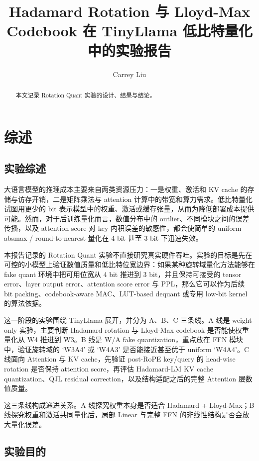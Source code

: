 \documentclass[lang=cn,chinesefont=nofont,a4paper,newtx]{elegantpaper}
\title{Hadamard Rotation 与 Lloyd-Max Codebook 在 TinyLlama 低比特量化中的实验报告}
\author{Carrey Liu}
\institute{Zhejiang University}
\date{\zhdate{2026/5/9}}
\begin{document}
\maketitle

\begin{abstract}
本文记录 Rotation Quant 实验的设计、结果与结论。
\end{abstract}

\section{综述}

\subsection{实验综述}

大语言模型的推理成本主要来自两类资源压力：一是权重、激活和 KV cache 的存储与访存开销，二是矩阵乘法与 attention 计算中的带宽和算力需求。低比特量化试图用更少的 bit 表示模型中的权重、激活或缓存张量，从而为降低部署成本提供可能。然而，对于后训练量化而言，数值分布中的 outlier、不同模块之间的误差传播，以及 attention score 对 key 内积误差的敏感性，都会使简单的 uniform absmax / round-to-nearest 量化在 4 bit 甚至 3 bit 下迅速失效。

本报告记录的 Rotation Quant 实验不直接研究真实硬件吞吐。实验的目标是先在可控的小模型上验证数值质量和低比特位宽边界：如果某种旋转域量化方法能够在 fake quant 环境中把可用位宽从 4 bit 推进到 3 bit，并且保持可接受的 tensor error、layer output error、attention score error 与 PPL，那么它可以作为后续 bit packing、codebook-aware MAC、LUT-based dequant 或专用 low-bit kernel 的算法依据。

这一阶段的实验围绕 TinyLlama 展开，并分为 A、B、C 三条线。A 线是 weight-only 实验，主要判断 Hadamard rotation 与 Lloyd-Max codebook 是否能使权重量化从 W4 推进到 W3。B 线是 W/A fake quantization，重点放在 FFN 模块中，验证旋转域的 `W3A4' 或 `W4A3' 是否能接近甚至优于 uniform `W4A4'。C 线面向 Attention 与 KV cache，先验证 post-RoPE key/query 的 head-wise rotation 是否保持 attention score，再评估 Hadamard-LM KV cache quantization、QJL residual correction，以及结构适配之后的完整 Attention 层数值质量。

这三条线构成递进关系。A 线探究权重本身是否适合 Hadamard + Lloyd-Max；B 线探究权重和激活共同量化后，局部 Linear 与完整 FFN 的非线性结构是否会放大量化误差。

\subsection{实验目的}
\end{document}
